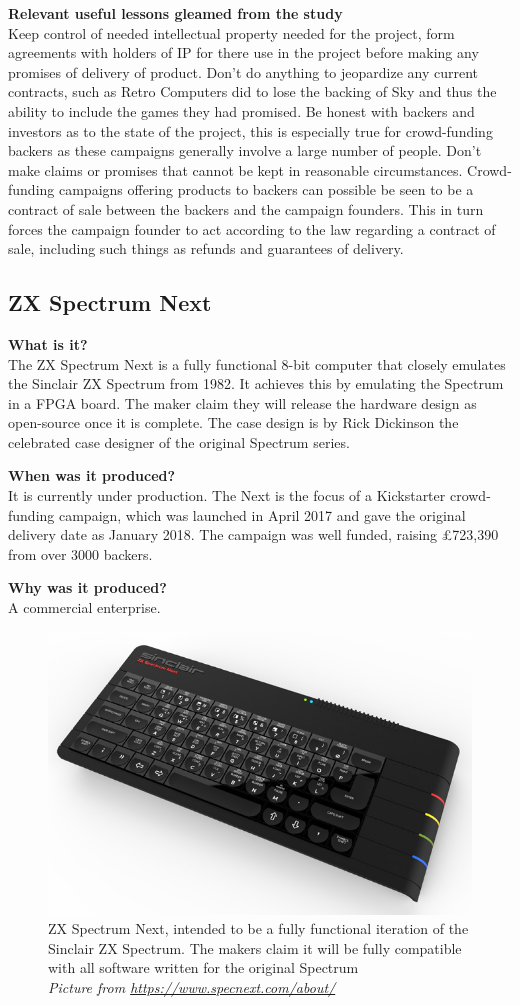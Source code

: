 \textbf{Relevant useful lessons gleamed from the study}\\
Keep control of needed intellectual property needed for the project, form agreements with holders of IP for there use in the project before making any promises of delivery of product. Don't do anything to jeopardize any current contracts, such as Retro Computers did to lose the backing of Sky and thus the ability to include the games they had promised.
Be honest with backers and investors as to the state of the project, this is especially true for crowd-funding backers as these campaigns generally involve a large number of people.
Don't make claims or promises that cannot be kept in reasonable circumstances.
Crowd-funding campaigns offering products to backers can possible be seen to be a contract of sale between the backers and the campaign founders. This in turn forces the campaign founder to act according to the law regarding a contract of sale, including such things as refunds and guarantees of delivery.


\subsection{ZX Spectrum Next}

\textbf{What is it?}\\
The ZX Spectrum Next is a fully functional 8-bit computer that closely emulates the Sinclair ZX Spectrum from 1982. It achieves this by emulating the Spectrum in a FPGA board. The maker claim they will release the hardware design as open-source once it is complete. The case design is by Rick Dickinson the celebrated case designer of the original Spectrum series.

\textbf{When was it produced?}\\
It is currently under production. The Next is the focus of a Kickstarter crowd-funding campaign, which was launched in April 2017 and gave the original delivery date as January 2018. The campaign was well funded, raising £723,390 from over 3000 backers.

\textbf{Why was it produced?}\\
A commercial enterprise.

\begin{figure} \begin{center}
\includegraphics[width=.3\linewidth]{pics/spectrum_next} 
\end{center} 
\caption{ZX Spectrum Next, intended to be a fully functional iteration of the Sinclair ZX Spectrum. The makers claim it will be fully compatible with all software written for the original Spectrum \\ \textit{\small{Picture from \url {https://www.specnext.com/about/}}}}
\label{Spectrum_Next}
\end{figure} 


